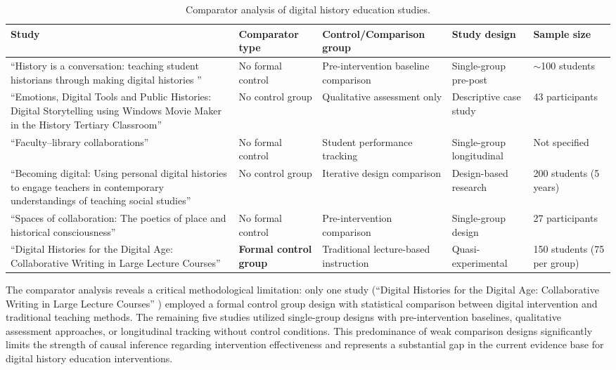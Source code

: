 \documentclass[
hf,
]{ceurart}
\begin{document}
\begin{table}[htbp]
\centering
\caption{Comparator analysis of digital history education studies.}
\label{tab:comparators}
\begin{tabular}{|p{4cm}|p{2.5cm}|p{4cm}|p{2.5cm}|p{2cm}|}
\hline
\textbf{Study} & \textbf{Comparator type} & \textbf{Control/Comparison group} & \textbf{Study design} & \textbf{Sample size} \\
\hline
``History is a conversation: teaching student historians through making digital histories '' \cite{Bell2016} & No formal control & Pre-intervention baseline comparison & Single-group pre-post & $\sim$100 students \\
\hline
``Emotions, Digital Tools and Public Histories: Digital Storytelling using Windows Movie Maker in the History Tertiary Classroom'' \cite{Coleborne2011} & No control group & Qualitative assessment only & Descriptive case study & 43 participants \\
\hline
``Faculty–library collaborations'' \cite{Davis2017} & No formal control & Student performance tracking & Single-group longitudinal & Not specified \\
\hline
``Becoming digital: Using personal digital histories to engage teachers in contemporary understandings of teaching social studies'' \cite{Lee2014159} & No control group & Iterative design comparison & Design-based research & 200 students (5 years) \\
\hline
``Spaces of collaboration: The poetics of place and historical consciousness'' \cite{McLean20144} & No formal control & Pre-intervention comparison & Single-group design & 27 participants \\
\hline
``Digital Histories for the Digital Age: Collaborative Writing in Large Lecture Courses'' \cite{Soh2013} & \textbf{Formal control group} & Traditional lecture-based instruction & Quasi-experimental & 150 students (75 per group) \\
\hline
\end{tabular}
\end{table}

The comparator analysis reveals a critical methodological limitation: only one study (``Digital Histories for the Digital Age: Collaborative Writing in Large Lecture Courses'' \cite{Soh2013}) employed a formal control group design with statistical comparison between digital intervention and traditional teaching methods. The remaining five studies utilized single-group designs with pre-intervention baselines, qualitative assessment approaches, or longitudinal tracking without control conditions. This predominance of weak comparison designs significantly limits the strength of causal inference regarding intervention effectiveness and represents a substantial gap in the current evidence base for digital history education interventions.
\end{document}
